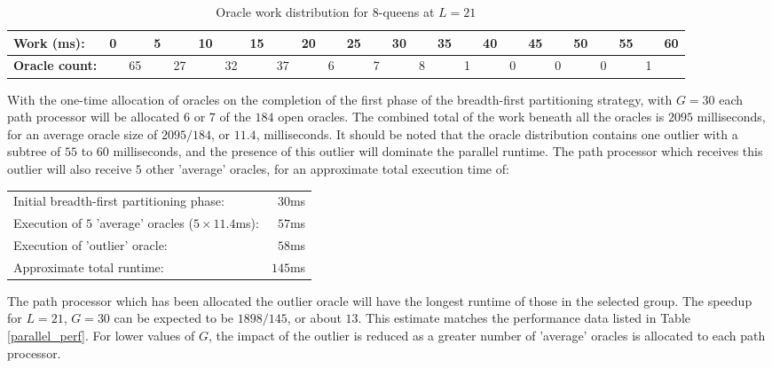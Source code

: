 \begin{table}[htbp]
{\small
\begin{tabular}{| l | r @{} r @{} r @{} r @{} r @{} r @{} r @{} r @{}
    r @{} r @{} r @{} r @{} r @{} r @{} r @{} r @{} r @{} r @{} r @{} 
    r @{} r @{} r @{} r @{} r @{} r |}
\hline
\textbf{Work (ms):} & 0 & & 5 & & 10 & & 15 & & 20 & & 25 & & 30 & & 35 & & 40
     & & 45 & & 50 & & 55 & & 60 \\
\hline
\textbf{Oracle count:} & & 65 & & 27 & & 32 & & 37 & & 6 & & 7 & & 8 & & 1
   & & 0 & & 0 & & 0 & & 1 &\\
\hline
\end{tabular}
}
\caption{Oracle work distribution for 8-queens at $L=21$}
\label{q8_orcs}
\end{table}

With the one-time allocation of oracles on the completion of the first phase of
the breadth-first partitioning strategy, with $G=30$ each path processor will be
 allocated $6$ or $7$ of the $184$ open oracles.  The combined total of the work beneath
all the oracles is $2095$ milliseconds, for an average oracle size of $2095/184$, or
$11.4$, milliseconds.  It should be noted that the oracle distribution contains one
outlier with a subtree of $55$ to $60$ milliseconds, and the presence of this outlier
will dominate the parallel runtime.  The path processor which receives this outlier will
also receive $5$ other 'average' oracles, for an approximate total execution time of:

\begin{tabular}{l r}
Initial breadth-first partitioning phase:               & $30$ms  \\
Execution of $5$ 'average' oracles ($5 \times 11.4$ms): & $57$ms  \\
Execution of 'outlier' oracle:                          & $58$ms  \\
Approximate total runtime:                              & $145$ms \\
\end{tabular}

The path processor which has been allocated the outlier oracle will
have the longest runtime of those in the selected group.  The speedup
for $L=21$, $G=30$ can be expected to be $1898/145$, or about $13$.  This
estimate matches the performance data listed in Table \ref{parallel_perf}.
For lower values of $G$, the impact of the outlier is reduced as a
greater number of 'average' oracles is allocated to each path processor.

